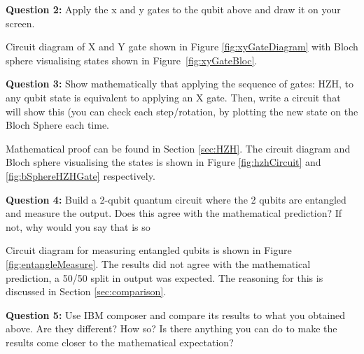 \textbf{Question 2:}
Apply the x and y gates to the qubit above and draw it on your screen.

Circuit diagram of X and Y gate shown in Figure \ref{fig:xyGateDiagram} with Bloch sphere visualising states shown in Figure~\ref{fig:xyGateBloc}.

\textbf{Question 3:}
Show mathematically that applying the sequence of gates: HZH, to any qubit state is equivalent to applying an X gate. Then, write a circuit that will show this (you can check each step/rotation, by plotting the new state on the Bloch Sphere each time.

Mathematical proof can be found in Section \ref{sec:HZH}. The circuit diagram and Bloch sphere visualising the states is shown in Figure \ref{fig:hzhCircuit} and \ref{fig:bSphereHZHGate} respectively.

\textbf{Question 4:}
Build a 2-qubit quantum circuit where the 2 qubits are entangled and measure the output. Does this agree with the mathematical prediction? If not, why would you say that is so

Circuit diagram for measuring entangled qubits is shown in Figure \ref{fig:entangleMeasure}. The results did not agree with the mathematical prediction, a 50/50 split in output was expected. The reasoning for this is discussed in Section \ref{sec:comparison}.

\textbf{Question 5:}
Use IBM composer and compare its results to what you obtained above. Are they different? How so? Is there anything you can do to make the results come closer to the mathematical expectation?

